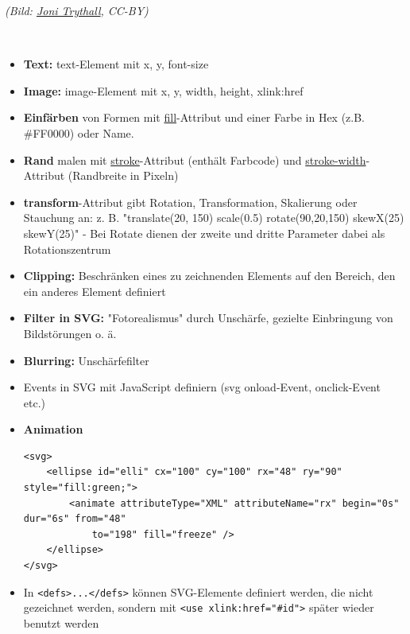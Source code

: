 \documentclass[12pt,landscape]{article}
\begin{document}
\begin{multicols}{3}
\begin{center}
\tiny{\textit{(Bild: \href{https://www.sitepoint.com/closer-look-svg-path-data/}{Joni Trythall}, CC-BY)}}
\end{center}\\
\begin{itemize}
\item \textbf{Text:} text-Element mit x, y, font-size
\item \textbf{Image:} image-Element mit x, y, width, height, xlink:href
\item \textbf{Einfärben} von Formen mit \underline{fill}-Attribut und einer Farbe in Hex (z.B. \#FF0000) oder Name.
\item \textbf{Rand} malen mit \underline{stroke}-Attribut (enthält Farbcode) und \underline{stroke-width}-Attribut (Randbreite in Pixeln)
\item \textbf{transform}-Attribut gibt Rotation, Transformation, Skalierung oder Stauchung an: z. B. "translate(20, 150) scale(0.5) rotate(90,20,150) skewX(25) skewY(25)" - Bei Rotate dienen der zweite und dritte Parameter dabei als Rotationszentrum
\item \textbf{Clipping:} Beschränken eines zu zeichnenden Elements auf den Bereich, den ein anderes Element definiert
\item \textbf{Filter in SVG:} "Fotorealismus" durch Unschärfe, gezielte Einbringung von Bildstörungen o. ä.
\item \textbf{Blurring:} Unschärfefilter
\item Events in SVG mit JavaScript definiern (svg onload-Event, onclick-Event etc.)
\item \textbf{Animation} \begin{lstlisting}
<svg>
    <ellipse id="elli" cx="100" cy="100" rx="48" ry="90" style="fill:green;">
        <animate attributeType="XML" attributeName="rx" begin="0s" dur="6s" from="48"
            to="198" fill="freeze" />
    </ellipse>
</svg> 
\end{lstlisting}
\item In \lstinline|<defs>...</defs>| können SVG-Elemente definiert werden, die nicht gezeichnet werden, sondern mit \lstinline|<use xlink:href="#id">| später wieder benutzt werden
\end{itemize}

\end{multicols}
\end{document}

